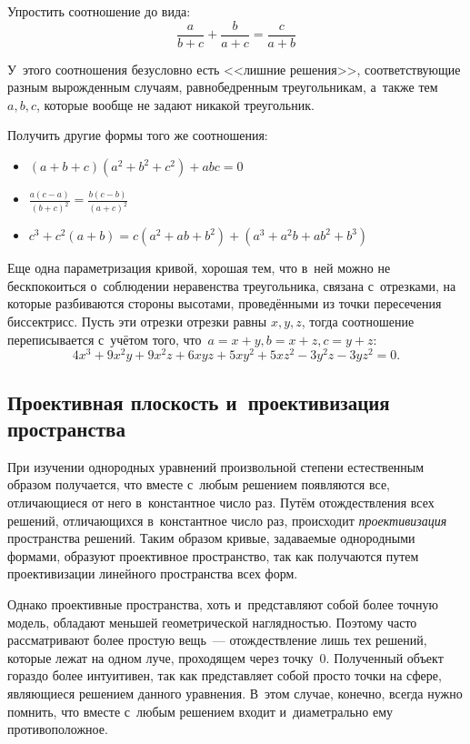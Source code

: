 \documentclass{article}
\begin{document}
\begin{exercise}
  Упростить соотношение до вида:
  $$ \frac{a}{b+c} + \frac{b}{a + c} = \frac{c}{a + b} $$
\end{exercise}

У~этого соотношения безусловно есть <<лишние решения>>, соответствующие разным
вырожденным случаям, равнобедренным треугольникам, а~также тем~$a, b, c$,
которые вообще не задают никакой треугольник.

\begin{exercise}
  Получить другие формы того же соотношения:
  \begin{itemize}
    \item $(a + b + c)(a^2 + b^2 + c^2) + abc = 0$
    \item $\frac{a(c - a)}{(b+c)^2} = \frac{b(c - b)}{(a+c)^2}$
    \item $c^3 + c^2(a + b) = c(a^2 + ab + b^2) + (a^3 + a^2b + ab^2 + b^3)$
  \end{itemize}
\end{exercise}

Еще одна параметризация кривой, хорошая тем, что в~ней можно не бескпокоиться
о~соблюдении неравенства треугольника, связана с~отрезками, на которые
разбиваются стороны высотами, проведёнными из точки пересечения биссектрисс.
Пусть эти отрезки отрезки равны $x, y, z$, тогда соотношение переписывается
с~учётом того, что~$a = x + y, b = x + z, c = y + z$:
$$ 4x^3 + 9x^2y + 9x^2z + 6xyz + 5xy^2 + 5xz^2 - 3y^2z - 3yz^2 = 0. $$

\subsection{Проективная плоскость и~проективизация пространства}

При изучении однородных уравнений произвольной степени естественным образом
получается, что вместе с~любым решением появляются все, отличающиеся от него
в~константное число раз. Путём отождествления всех решений, отличающихся
в~константное число раз, происходит \emph{проективизация} пространства решений.
Таким образом кривые, задаваемые однородными формами, образуют проективное
пространство, так как получаются путем проективизации линейного пространства
всех форм.

Однако проективные пространства, хоть и~представляют собой более точную модель,
обладают меньшей геометрической наглядностью. Поэтому часто рассматривают более
простую вещь~--- отождествление лишь тех решений, которые лежат на одном луче,
проходящем через точку~0. Полученный объект гораздо более интуитивен, так как
представляет собой просто точки на сфере, являющиеся решением данного уравнения.
В~этом случае, конечно, всегда нужно помнить, что вместе с~любым решением входит
и~диаметрально ему противоположное.
\end{document}
